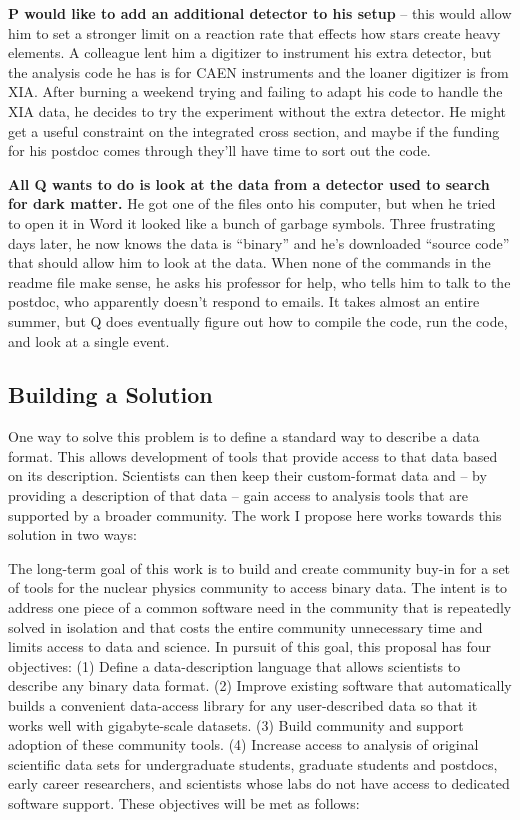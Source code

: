 \textbf{P would like to add an additional detector to his setup} -- this would allow him to set a stronger limit on a reaction rate that effects how stars create heavy elements.  A colleague lent him a digitizer to instrument his extra detector, but the analysis code he has is for CAEN instruments and the loaner digitizer is from XIA.  After burning a weekend trying and failing to adapt his code to handle the XIA data, he decides to try the experiment without the extra detector.  He might get a useful constraint on the integrated cross section, and maybe if the funding for his postdoc comes through they'll have time to sort out the code.
 
\textbf{All Q wants to do is look at the data from a detector used to search for dark matter.}  He got one of the files onto his computer, but when he tried to open it in Word it looked like a bunch of garbage symbols.  Three frustrating days later, he now knows the data is ``binary'' and he's downloaded ``source code''  
that should allow him to look at the data.  When none of the commands in the readme file make sense, he asks his professor for help, who tells him to talk to the postdoc, who apparently doesn't respond to emails.  It takes almost an entire summer, but Q does eventually figure out how to compile the code, run the code, and look at a single event.   

\subsection{Building a Solution}
One way to solve this problem is to define a standard way to describe a data format.  This allows development of tools that provide access to that data based on its description.  Scientists can then keep their custom-format data and – by providing a description of that data – gain access to analysis tools that are supported by a broader community.  The work I propose here works towards this solution in two ways:

The long-term goal of this work is to build and create community buy-in for a set of tools for the nuclear physics community to access binary data.  The intent is to address one piece of a common software need in the community that is repeatedly solved in isolation and that costs the entire community unnecessary time and limits access to data and science. In pursuit of this goal, this proposal has four objectives:  
(1) Define a data-description language that allows scientists to describe any binary data format.
(2) Improve existing software that automatically builds a convenient data-access library for any user-described data so that it works well with gigabyte-scale datasets.
(3) Build community and support adoption of these community tools.
(4) Increase access to analysis of original scientific data sets for undergraduate students, graduate students and postdocs, early career researchers, and scientists whose labs do not have access to dedicated software support. 
These objectives will be met as follows:

